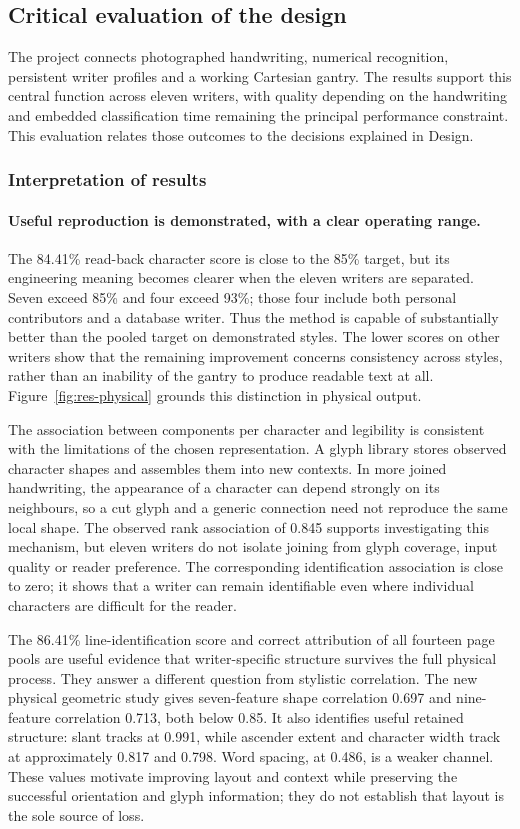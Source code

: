 \label{sec:discussion}
\subsection{Critical evaluation of the design}
\label{sec:dis-critical}
The project connects photographed handwriting, numerical recognition, persistent writer profiles and a working Cartesian gantry. The results support this central function across eleven writers, with quality depending on the handwriting and embedded classification time remaining the principal performance constraint. This evaluation relates those outcomes to the decisions explained in Design.

\subsubsection{Interpretation of results}
\label{sec:dis-interpretation}
\paragraph{Useful reproduction is demonstrated, with a clear operating range.}
The 84.41\% read-back character score is close to the 85\% target, but its engineering meaning becomes clearer when the eleven writers are separated. Seven exceed 85\% and four exceed 93\%; those four include both personal contributors and a database writer. Thus the method is capable of substantially better than the pooled target on demonstrated styles. The lower scores on other writers show that the remaining improvement concerns consistency across styles, rather than an inability of the gantry to produce readable text at all. Figure~\ref{fig:res-physical} grounds this distinction in physical output.

The association between components per character and legibility is consistent with the limitations of the chosen representation. A glyph library stores observed character shapes and assembles them into new contexts. In more joined handwriting, the appearance of a character can depend strongly on its neighbours, so a cut glyph and a generic connection need not reproduce the same local shape. The observed rank association of 0.845 supports investigating this mechanism, but eleven writers do not isolate joining from glyph coverage, input quality or reader preference. The corresponding identification association is close to zero; it shows that a writer can remain identifiable even where individual characters are difficult for the reader.

The 86.41\% line-identification score and correct attribution of all fourteen page pools are useful evidence that writer-specific structure survives the full physical process. They answer a different question from stylistic correlation. The new physical geometric study gives seven-feature shape correlation 0.697 and nine-feature correlation 0.713, both below 0.85. It also identifies useful retained structure: slant tracks at 0.991, while ascender extent and character width track at approximately 0.817 and 0.798. Word spacing, at 0.486, is a weaker channel. These values motivate improving layout and context while preserving the successful orientation and glyph information; they do not establish that layout is the sole source of loss.

